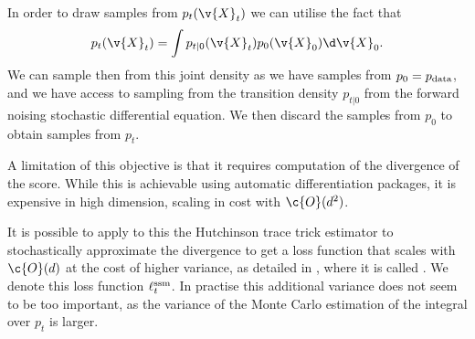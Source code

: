 In order to draw samples from \(p_t(\v{X}_t)\) we can utilise the fact that \[p_t(\v{X}_t) = \int p_{t|0}(\v{X}_t) p_0(\v{X}_0) \d \v{X}_0.\]
We can sample then from this joint density as we have samples from \(p_0 = p_{\text{data}}\), and we have access to sampling from the transition density \( p_{t|0}\) from the forward noising stochastic differential equation.
We then discard the samples from \(p_0\) to obtain samples from \(p_t\).

A limitation of this objective is that it requires computation of the divergence of the score.
While this is achievable using automatic differentiation packages, it is expensive in high dimension, scaling in cost with \(\c{O}(d^2)\).

It is possible to apply to this the Hutchinson trace trick estimator \parencite{hutchinson1989stochastic} to stochastically approximate the divergence to get a loss function that scales with \(\c{O}(d)\) at the cost of higher variance, as detailed in \textcite{song2020sliced}, where it is called .
We denote this loss function \(\ell^{\text{ssm}}_t{}\).
In practise this additional variance does not seem to be too important, as the variance of the Monte Carlo estimation of the integral over \(p_t\) is larger.

